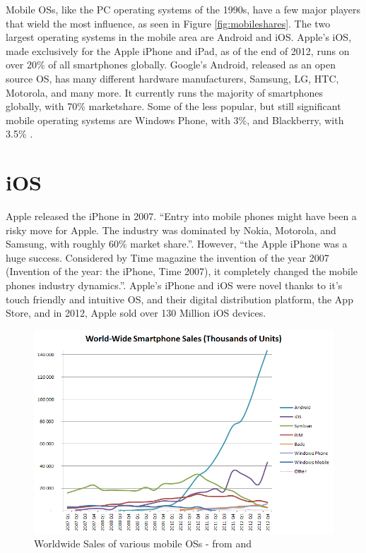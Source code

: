 Mobile OSs, like the PC operating systems of the 1990s, have a few major players that wield the most influence, as seen in Figure \ref{fig:mobileshares}. The two largest operating systems in the mobile area are Android and iOS. Apple's iOS, made exclusively for the Apple iPhone and iPad, as of the end of 2012, runs on over 20\%\citep{gartnerq42012} of all smartphones globally. Google's Android, released as an open source OS, has many different hardware manufacturers, Samsung, LG, HTC, Motorola, and many more. It currently runs the majority of smartphones globally, with 70\%\citep{gartnerq42012}  marketshare. Some of the less popular, but still significant mobile operating systems are Windows Phone, with 3\%, and Blackberry, with 3.5\%\citep{gartnerq42012} . 

\section{iOS}
Apple released the iPhone in 2007. ``Entry into mobile phones might have been a risky move for Apple. The industry was dominated by Nokia, Motorola, and Samsung, with roughly 60\% market share.''\citep{yoffie2010apple}. However, ``the Apple iPhone was a huge success. Considered by Time magazine the invention of the year 2007 (Invention of the year: the iPhone, Time 2007), it completely changed the mobile phones industry dynamics.''\citep{reis2012leadership}. Apple's iPhone and iOS were novel thanks to it's touch friendly and intuitive OS, and their digital distribution platform, the App Store\citep{yoffie2010apple}, and in 2012, Apple sold over 130 Million iOS devices\citep{gartnerq42012}.

\begin{figure}[h]
\begin{center}
\includegraphics[width=0.8\columnwidth]{figs/World_Wide_Smartphone_Sales}
\caption{Worldwide Sales of various mobile OSs - from \citep{wikimobilesales} and \citep{gartnerq42012}}
\label{fig:mobilesales}
\end{center}
\end{figure}


